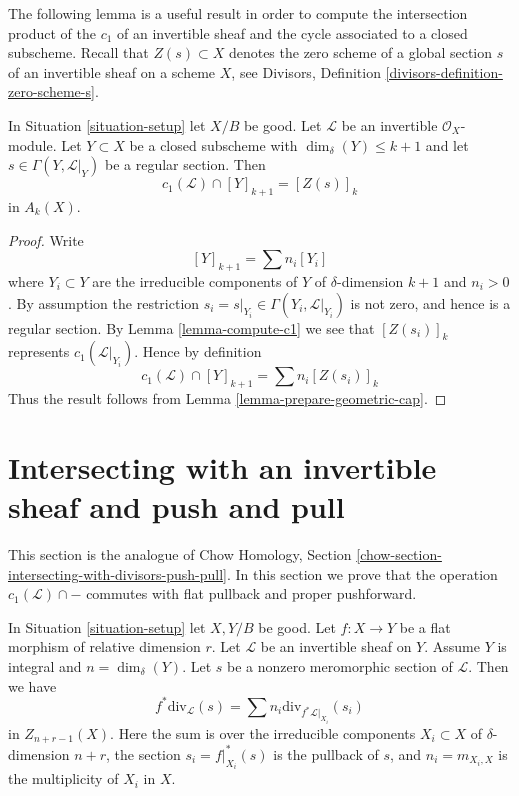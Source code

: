 \noindent
The following lemma is a useful result in order to compute the intersection
product of the $c_1$ of an invertible sheaf and the cycle associated
to a closed subscheme.
Recall that $Z(s) \subset X$ denotes the zero scheme of a global section
$s$ of an invertible sheaf on a scheme $X$, see
Divisors, Definition \ref{divisors-definition-zero-scheme-s}.

\begin{lemma}
\label{lemma-geometric-cap}
In Situation \ref{situation-setup} let $X/B$ be good.
Let $\mathcal{L}$ be an invertible $\mathcal{O}_X$-module.
Let $Y \subset X$ be a closed subscheme with
$\dim_\delta(Y) \leq k + 1$ and let $s \in \Gamma(Y, \mathcal{L}|_Y)$
be a regular section. Then
$$
c_1(\mathcal{L}) \cap [Y]_{k + 1} = [Z(s)]_k
$$
in $A_k(X)$.
\end{lemma}

\begin{proof}
Write
$$
[Y]_{k + 1} = \sum n_i[Y_i]
$$
where $Y_i \subset Y$ are the irreducible components of
$Y$ of $\delta$-dimension $k + 1$ and $n_i > 0$.
By assumption the restriction
$s_i = s|_{Y_i} \in \Gamma(Y_i, \mathcal{L}|_{Y_i})$ is not
zero, and hence is a regular section. By Lemma \ref{lemma-compute-c1}
we see that $[Z(s_i)]_k$ represents $c_1(\mathcal{L}|_{Y_i})$.
Hence by definition
$$
c_1(\mathcal{L}) \cap [Y]_{k + 1} = \sum n_i[Z(s_i)]_k
$$
Thus the result follows from Lemma \ref{lemma-prepare-geometric-cap}.
\end{proof}









\section{Intersecting with an invertible sheaf and push and pull}
\label{section-intersecting-with-divisors-push-pull}

\noindent
This section is the analogue of
Chow Homology, Section \ref{chow-section-intersecting-with-divisors-push-pull}.
In this section we prove that the operation $c_1(\mathcal{L}) \cap -$
commutes with flat pullback and proper pushforward.

\begin{lemma}
\label{lemma-prepare-flat-pullback-cap-c1}
In Situation \ref{situation-setup} let $X, Y/B$ be good.
Let $f : X \to Y$ be a flat morphism of relative dimension $r$.
Let $\mathcal{L}$ be an invertible sheaf on $Y$.
Assume $Y$ is integral and $n = \dim_\delta(Y)$.
Let $s$ be a nonzero meromorphic section of $\mathcal{L}$.
Then we have
$$
f^*\text{div}_\mathcal{L}(s) = \sum n_i\text{div}_{f^*\mathcal{L}|_{X_i}}(s_i)
$$
in $Z_{n + r - 1}(X)$. Here the sum is over the irreducible
components $X_i \subset X$ of $\delta$-dimension $n + r$,
the section $s_i = f|_{X_i}^*(s)$ is the pullback of $s$, and
$n_i = m_{X_i, X}$ is the multiplicity of $X_i$ in $X$.
\end{lemma}

